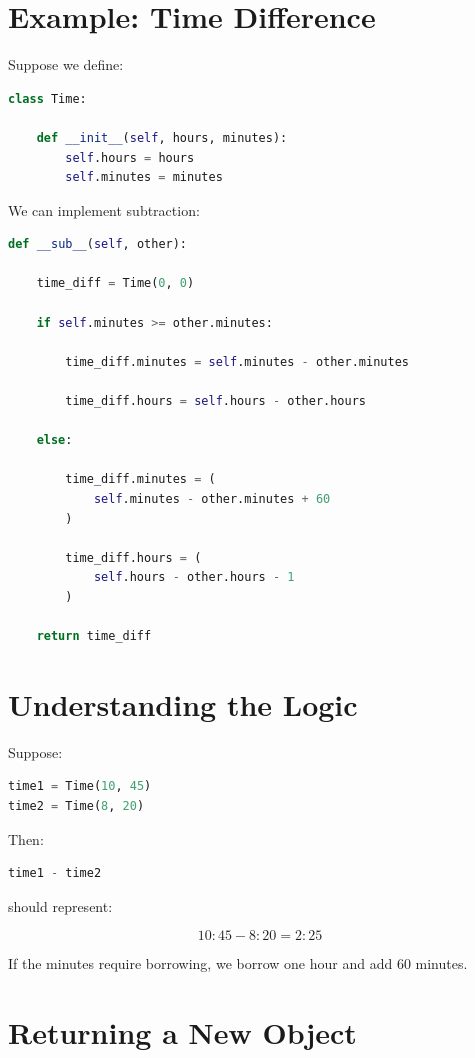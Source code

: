 \documentclass[11pt]{article}
\begin{document}
\section{Example: Time Difference}

Suppose we define:

\begin{lstlisting}[language=Python]
class Time:

    def __init__(self, hours, minutes):
        self.hours = hours
        self.minutes = minutes
\end{lstlisting}

We can implement subtraction:

\begin{lstlisting}[language=Python]
def __sub__(self, other):

    time_diff = Time(0, 0)

    if self.minutes >= other.minutes:

        time_diff.minutes = self.minutes - other.minutes

        time_diff.hours = self.hours - other.hours

    else:

        time_diff.minutes = (
            self.minutes - other.minutes + 60
        )

        time_diff.hours = (
            self.hours - other.hours - 1
        )

    return time_diff
\end{lstlisting}

\section{Understanding the Logic}

Suppose:

\begin{lstlisting}[language=Python]
time1 = Time(10, 45)
time2 = Time(8, 20)
\end{lstlisting}

Then:

\begin{lstlisting}[language=Python]
time1 - time2
\end{lstlisting}

should represent:

\[
10:45 - 8:20 = 2:25
\]

If the minutes require borrowing, we borrow one hour and add 60 minutes.

\section{Returning a New Object}
\end{document}
